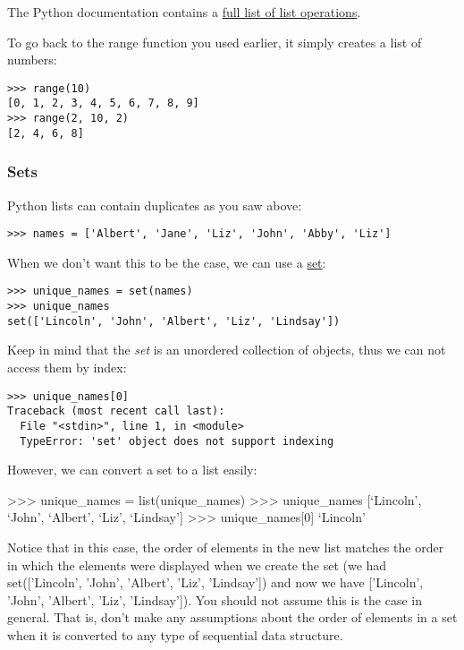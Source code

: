 The Python documentation contains a \href{}{full list of list
operations}.

To go back to the range function you used earlier, it simply creates a
list of numbers:

\begin{verbatim}
>>> range(10)
[0, 1, 2, 3, 4, 5, 6, 7, 8, 9]
>>> range(2, 10, 2)
[2, 4, 6, 8]
\end{verbatim}

\subsubsection{Sets}\label{sets}

Python lists can contain duplicates as you saw above:

\begin{verbatim}
>>> names = ['Albert', 'Jane', 'Liz', 'John', 'Abby', 'Liz']
\end{verbatim}

When we don't want this to be the case, we can use a
\href{https://docs.python.org/2/library/stdtypes.html\#set}{set}:

\begin{verbatim}
>>> unique_names = set(names)
>>> unique_names
set(['Lincoln', 'John', 'Albert', 'Liz', 'Lindsay'])
\end{verbatim}

Keep in mind that the \emph{set} is an unordered collection of objects,
thus we can not access them by index:

\begin{verbatim}
>>> unique_names[0]
Traceback (most recent call last):
  File "<stdin>", line 1, in <module>
  TypeError: 'set' object does not support indexing
\end{verbatim}

However, we can convert a set to a list easily:

\textgreater{}\textgreater{}\textgreater{} unique\_names =
list(unique\_names) \textgreater{}\textgreater{}\textgreater{}
unique\_names {[}`Lincoln', `John', `Albert', `Liz', `Lindsay'{]}
\textgreater{}\textgreater{}\textgreater{} unique\_names{[}0{]}
`Lincoln'

Notice that in this case, the order of elements in the new list matches
the order in which the elements were displayed when we create the set
(we had set({[}'Lincoln', 'John', 'Albert', 'Liz',
'Lindsay'{]}) and now we have {[}'Lincoln', 'John', 'Albert', 'Liz',
'Lindsay'{]}). You should not assume this is the case in general. That
is, don't make any assumptions about the order of elements in a set when
it is converted to any type of sequential data structure.


